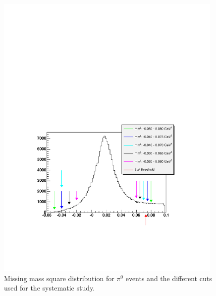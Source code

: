 \begin{figure}[h]
 \begin{center}
  \includegraphics[width = 11cm, bb = 80 140 540 480]{systematics/img/mmcuts}
  \caption{ Missing mass square distribution for $\pi^0$ events and the different
            cuts used for the systematic study. }
  \label{fig:mmcuts}
 \end{center}
\end{figure} 

